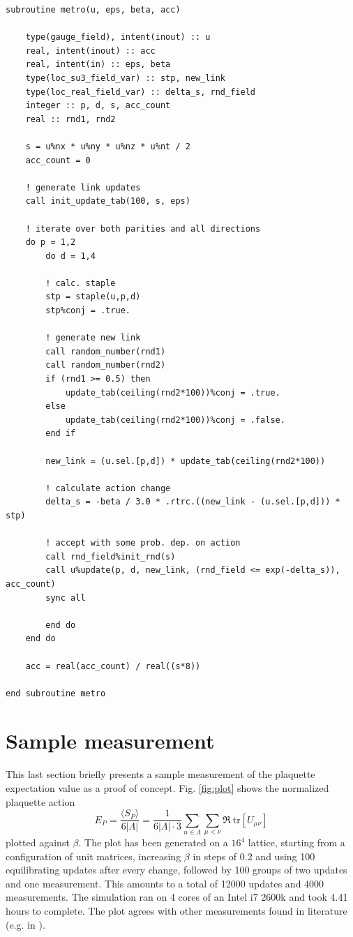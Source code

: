 \documentclass[graybox]{svmult}
\begin{document}
\begin{lstlisting}[caption={Metro subroutine running one sweep for both parities and each direction}]
subroutine metro(u, eps, beta, acc)

    type(gauge_field), intent(inout) :: u
	real, intent(inout) :: acc
	real, intent(in) :: eps, beta
	type(loc_su3_field_var) :: stp, new_link
	type(loc_real_field_var) :: delta_s, rnd_field
	integer :: p, d, s, acc_count
	real :: rnd1, rnd2
	
	s = u%nx * u%ny * u%nz * u%nt / 2
	acc_count = 0
	
	! generate link updates
	call init_update_tab(100, s, eps)

    ! iterate over both parities and all directions
    do p = 1,2
        do d = 1,4

        ! calc. staple
        stp = staple(u,p,d)
        stp%conj = .true.

        ! generate new link
        call random_number(rnd1)
        call random_number(rnd2)
        if (rnd1 >= 0.5) then
            update_tab(ceiling(rnd2*100))%conj = .true.
        else
            update_tab(ceiling(rnd2*100))%conj = .false.
        end if

        new_link = (u.sel.[p,d]) * update_tab(ceiling(rnd2*100))

        ! calculate action change
        delta_s = -beta / 3.0 * .rtrc.((new_link - (u.sel.[p,d])) * stp)

        ! accept with some prob. dep. on action
        call rnd_field%init_rnd(s)
        call u%update(p, d, new_link, (rnd_field <= exp(-delta_s)), acc_count)
        sync all

        end do
    end do

    acc = real(acc_count) / real((s*8))

end subroutine metro
\end{lstlisting}

\section{Sample measurement}

This last section briefly presents a sample measurement of the plaquette expectation value as a proof of concept. Fig. \ref{fig:plot} shows the normalized plaquette action
\begin{equation}
E_P = \frac{\langle S_P \rangle} {6|\Lambda|} = \frac{1} {6|\Lambda| \cdot 3} \sum_{n \in \Lambda} \sum_{\mu < \nu} \Re\ \text{tr} [U_{\mu\nu}]
\end{equation}
plotted against $\beta$. The plot has been generated on a $16^4$ lattice, starting from a configuration of unit matrices, increasing $\beta$ in steps of 0.2 and using 100 equilibrating updates after every change, followed by 100 groups of two updates and one measurement. This amounts to a total of 12000 updates and 4000 measurements. The simulation ran on 4 cores of an Intel i7 2600k and took 4.41 hours to complete. The plot agrees with other measurements found in literature (e.g. in \cite{gattringer}).
\end{document}
